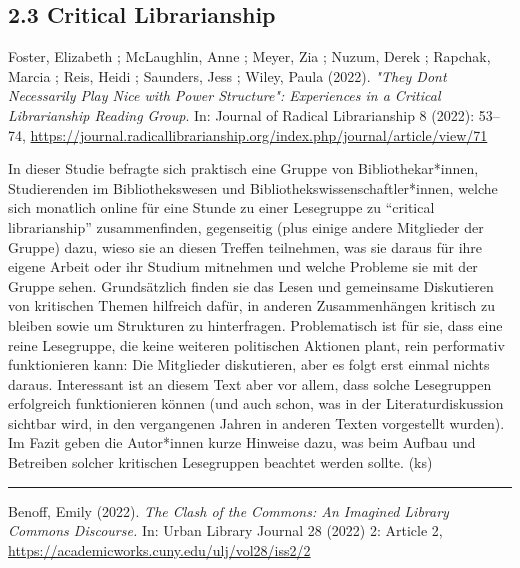 \documentclass[a4paper,
fontsize=11pt,
oneside,
numbers=noperiodatend,
parskip=half-,
bibliography=totoc,
final
]{scrartcl}
\begin{document}
\hypertarget{critical-librarianship}{%
\subsection{2.3 Critical Librarianship}\label{critical-librarianship}}

Foster, Elizabeth ; McLaughlin, Anne ; Meyer, Zia ; Nuzum, Derek ;
Rapchak, Marcia ; Reis, Heidi ; Saunders, Jess ; Wiley, Paula (2022).
\emph{"They Don\textquotesingle t Necessarily Play Nice with Power
Structure": Experiences in a Critical Librarianship Reading Group}. In:
Journal of Radical Librarianship 8 (2022): 53--74,
\url{https://journal.radicallibrarianship.org/index.php/journal/article/view/71}

In dieser Studie befragte sich praktisch eine Gruppe von
Bibliothekar*innen, Studierenden im Bibliothekswesen und
Bibliothekswissenschaftler*innen, welche sich monatlich online für eine
Stunde zu einer Lesegruppe zu \enquote{critical librarianship}
zusammenfinden, gegenseitig (plus einige andere Mitglieder der Gruppe)
dazu, wieso sie an diesen Treffen teilnehmen, was sie daraus für ihre
eigene Arbeit oder ihr Studium mitnehmen und welche Probleme sie mit der
Gruppe sehen. Grundsätzlich finden sie das Lesen und gemeinsame
Diskutieren von kritischen Themen hilfreich dafür, in anderen
Zusammenhängen kritisch zu bleiben sowie um Strukturen zu hinterfragen.
Problematisch ist für sie, dass eine reine Lesegruppe, die keine
weiteren politischen Aktionen plant, rein performativ funktionieren
kann: Die Mitglieder diskutieren, aber es folgt erst einmal nichts
daraus. Interessant ist an diesem Text aber vor allem, dass solche
Lesegruppen erfolgreich funktionieren können (und auch schon, was in der
Literaturdiskussion sichtbar wird, in den vergangenen Jahren in anderen
Texten vorgestellt wurden). Im Fazit geben die Autor*innen kurze
Hinweise dazu, was beim Aufbau und Betreiben solcher kritischen
Lesegruppen beachtet werden sollte. (ks)

\begin{center}\rule{0.5\linewidth}{0.5pt}\end{center}

Benoff, Emily (2022). \emph{The Clash of the Commons: An Imagined
Library Commons Discourse.} In: Urban Library Journal 28 (2022) 2:
Article 2, \url{https://academicworks.cuny.edu/ulj/vol28/iss2/2}
\end{document}
